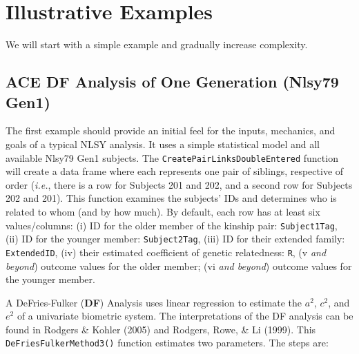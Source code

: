\documentclass[smallextended]{svjour3}       %
\begin{document}
\hypertarget{illustrative-examples}{%
\section{Illustrative Examples}\label{illustrative-examples}}

We will start with a simple example and gradually increase complexity.

\hypertarget{ace-df-analysis-of-one-generation-nlsy79-gen1}{%
\subsection{ACE DF Analysis of One Generation (Nlsy79
Gen1)}\label{ace-df-analysis-of-one-generation-nlsy79-gen1}}

The first example should provide an initial feel for the inputs,
mechanics, and goals of a typical NLSY analysis. It uses a simple
statistical model and all available Nlsy79 Gen1 subjects. The
\texttt{CreatePairLinksDoubleEntered} function will create a data frame
where each represents one pair of siblings, respective of order
(\emph{i.e.}, there is a row for Subjects 201 and 202, and a second row
for Subjects 202 and 201). This function examines the subjects' IDs and
determines who is related to whom (and by how much). By default, each
row has at least six values/columns: (i) ID for the older member of the
kinship pair: \texttt{Subject1Tag}, (ii) ID for the younger member:
\texttt{Subject2Tag}, (iii) ID for their extended family:
\texttt{ExtendedID}, (iv) their estimated coefficient of genetic
relatedness: \texttt{R}, (v \emph{and beyond}) outcome values for the
older member; (vi \emph{and beyond}) outcome values for the younger
member.

A DeFries-Fulker (\textbf{DF}) Analysis uses linear regression to
estimate the \(a^2\), \(c^2\), and \(e^2\) of a univariate biometric
system. The interpretations of the DF analysis can be found in Rodgers
\& Kohler (2005) and Rodgers, Rowe, \& Li (1999). This
\texttt{DeFriesFulkerMethod3()} function estimates two parameters. The
steps are:
\end{document}
